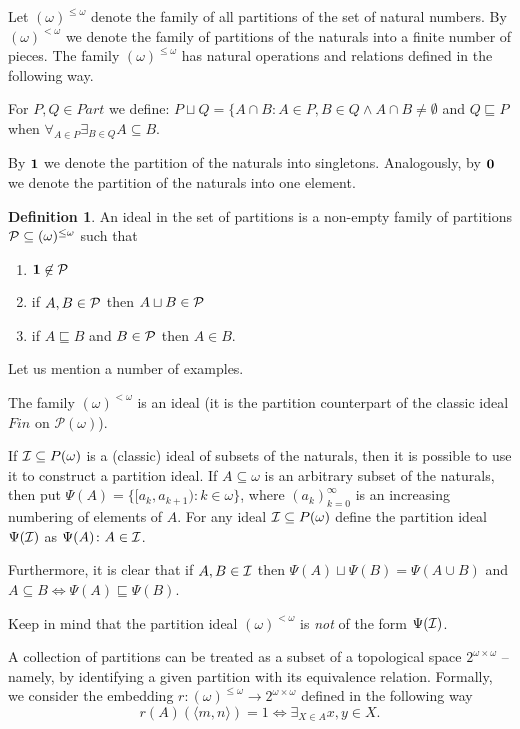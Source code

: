 \documentclass[12pt]{article}
\theoremstyle{plain}
\theoremstyle{definition}
\newtheorem{definition}[theorem]{Definition}
\theoremstyle{remark}
\newcommand{\cI}{{\cal I}}
\newcommand{\cP}{{\cal P}}
\newcommand{\Part}{(\omega)^{\leq\omega}}
\newcommand{\FinPart}{(\omega)^{<\omega}}
\begin{document}
Let $\Part$ denote the family of all partitions of the set of natural numbers. By $\FinPart$ we denote the family of partitions of the naturals into a finite number of pieces. The family $\Part$ has natural operations and relations defined in the following way.

For $P,Q \in Part$ we define:
$P\sqcup Q = \{A \cap B \colon A \in P, B\in Q \wedge 
A \cap B \not= \emptyset$
and $Q \sqsubseteq P$ when $\forall_{A\in P} \exists_{B\in Q} A\subseteq B$.

By ${\bf 1}$ we denote the partition of the naturals into singletons. Analogously, by ${\bf 0}$ we denote the partition of the naturals into one element.

\begin{definition}
An ideal in the set of partitions is a non-empty family of partitions $\cP \subseteq \Part$ such that
\begin{enumerate}
\item ${\bf 1} \not\in\cP$
\item if $A,B\in \cP$ then $A\sqcup B\in \cP$
\item if $A \sqsubseteq B$ and $B\in \cP$ then $A\in B$.
\end{enumerate}
\end{definition}
 
Let us mention a number of examples.

The family $\FinPart$ is an ideal (it is the partition counterpart of the classic ideal $Fin$ on $\mathcal{P}(\omega)$).

If $\cI\subseteq P(\omega)$ is a (classic) ideal of subsets of the naturals, then it is possible to use it to construct a partition ideal. If $A\subseteq\omega$ is an arbitrary subset of the naturals, then put $\Psi(A) = 
\{[a_k, a_{k+1}) \colon k\in\omega\}$, where
$(a_k)_{k=0}^{\infty}$ is an increasing numbering of elements of $A$. For any ideal $\cI \subseteq P(\omega)$ define the partition ideal $\Psi(\cI)$ as $\Psi(A)\colon A\in\cI$.

Furthermore, it is clear that if $A,B\in\cI$ then
$\Psi(A)\sqcup \Psi(B) = \Psi(A \cup B)$
and $A \subseteq B \iff \Psi(A) \sqsubseteq \Psi(B)$.

Keep in mind that the partition ideal $\FinPart$ is \textit{not} of the form $\Psi(\cI)$.

A collection of partitions can be treated as a subset of a topological space $2^{\omega\times\omega}$ -- namely, by identifying a given partition with its equivalence relation. Formally, we consider the embedding $r\colon\Part\to 2^{\omega\times\omega}$ defined in the following way
$$r(A)(\langle m,n\rangle) = 1 \iff \exists_{X\in A} x, y \in X.$$
\end{document}
